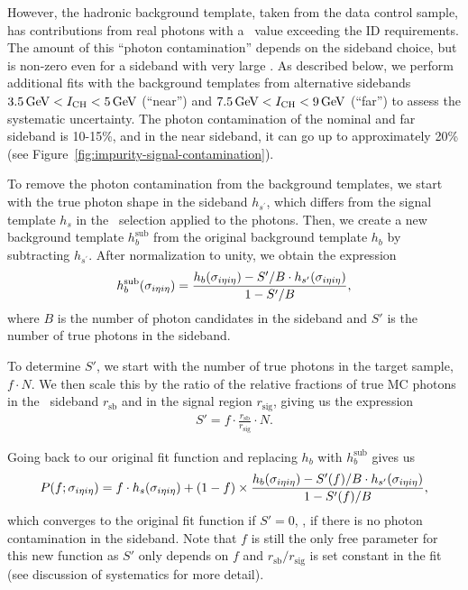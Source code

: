 However, the hadronic background template, taken from the data control sample, has contributions from real photons with a \ICH\ value exceeding the ID requirements. 
The amount of this ``photon contamination'' depends on the sideband choice, but is non-zero even for a sideband with very large \ICH. 
As described below, we perform additional fits with the background templates from alternative sidebands $3.5\,\text{Ge\hspace{-.08em}V} < I_{\text{CH}} < 5\,\text{Ge\hspace{-.08em}V}$ (``near'') and $7.5\,\text{Ge\hspace{-.08em}V} < I_{\text{CH}} < 9\,\text{Ge\hspace{-.08em}V}$ (``far'') to assess the systematic uncertainty. 
The photon contamination of the nominal and far sideband is 10-15\%, and in the near sideband, it can go up to approximately 20\% (see Figure~\ref{fig:impurity-signal-contamination}).

To remove the photon contamination from the background templates, we start with the true photon shape in the sideband $h_{s^{'}}$, which differs from the signal template $h_{s}$ in the \ICH\ selection applied to the photons.
Then, we create a new background template $h_{b}^{\text{sub}}$ from the original background template $h_{b}$ by subtracting $h_{s^{'}}$. 
After normalization to unity, we obtain the expression
\begin{align}
  h_{b}^{\text{sub}}(\sigma_{i\eta i\eta}) = \frac{h_{b}(\sigma_{i\eta i\eta}) - S'/B \cdot h_{s'}(\sigma_{i\eta i\eta})}{1 - S'/B},
\end{align}
where $B$ is the number of photon candidates in the sideband and $S'$ is the number of true photons in the sideband.

To determine $S'$, we start with the number of true photons in the target sample, $f \cdot N$. 
We then scale this by the ratio of the relative fractions of true MC photons in the \ICH\ sideband $r_{\text{sb}}$ and in the signal region $r_{\text{sig}}$, giving us the expression
\begin{align}
  S' = f \cdot \frac{r_{\text{sb}}}{r_{\text{sig}}} \cdot N .
\end{align}

Going back to our original fit function and replacing $h_{b}$ with $h_{b}^{\text{sub}}$ gives us
\begin{align}
  P(f;\sigma_{i\eta i\eta}) = f \cdot h_{s}(\sigma_{i\eta i\eta}) + (1 - f) \times \frac{h_{b}(\sigma_{i\eta i\eta}) - S'(f)/B \cdot h_{s'}(\sigma_{i\eta i\eta})}{1 - S'(f)/B},
\end{align}
which converges to the original fit function if $S' = 0$, \ie, if there is no photon contamination in the sideband. 
Note that $f$ is still the only free parameter for this new function as $S'$ only depends on $f$ and $r_{\text{sb}} / r_{\text{sig}}$ is set constant in the fit (see discussion of systematics for more detail).

